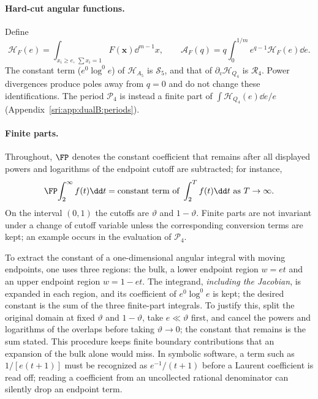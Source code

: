 \paragraph{Hard-cut angular functions.} Define
\begin{equation}
 \mathcal H_F(e)=\int_{x_i\ge e,\ \sum x_i=1}F(\boldsymbol x)\dd^{m-1}x,\qquad
 \mathcal A_F(q)=q\int_0^{1/m}e^{q-1}\mathcal H_F(e)\dd e.
 \label{sri:eq:dualB:angularH}
\end{equation}
The constant term ($e^0\log^0e$) of $\mathcal H_{A_5}$ is $\mathcal S_5$, and that of $\partial_v\mathcal H_{Q_4}$ is
$\mathcal R_4$. Power divergences produce poles away from $q=0$ and do not change these identifications. The period
$\mathcal P_4$ is instead a finite part of $\int\mathcal H_{Q_4}(e)\dd e/e$ (Appendix~\ref{sri:app:dualB:periods}).

\paragraph{Finite parts.} Throughout, $\FP$ denotes the constant coefficient that remains after all displayed powers
and logarithms of the endpoint cutoff are subtracted; for instance,
\begin{equation}
 \FP\!\int_2^\infty f(t)\dd t=\text{constant term of }\int_2^Tf(t)\dd t\text{ as }T\to\infty.
 \label{sri:eq:dualB:FPdef}
\end{equation}
On the interval $(0,1)$ the cutoffs are $\vartheta$ and $1-\vartheta$. Finite parts are not invariant under a change of
cutoff variable unless the corresponding conversion terms are kept; an example occurs in the evaluation of
$\mathcal P_4$.

To extract the constant of a one-dimensional angular integral with moving endpoints, one uses three regions: the bulk,
a lower endpoint region $w=et$ and an upper endpoint region $w=1-et$. The integrand, \emph{including the Jacobian}, is
expanded in each region, and its coefficient of $e^0\log^0e$ is kept; the desired constant is the sum of the three
finite-part integrals. To justify this, split the original domain at fixed $\vartheta$ and $1-\vartheta$, take
$e\ll\vartheta$ first, and cancel the powers and logarithms of the overlaps before taking $\vartheta\to0$; the constant
that remains is the sum stated. This procedure keeps finite boundary contributions that an expansion of the bulk alone
would miss. In symbolic software, a term such as $1/[e(t+1)]$ must be recognized as $e^{-1}/(t+1)$ before a Laurent
coefficient is read off; reading a coefficient from an uncollected rational denominator can silently drop an endpoint
term.

